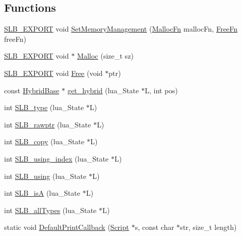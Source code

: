 \subsection*{Functions}
\begin{DoxyCompactItemize}
\item 
\hyperlink{SLB_8hpp_a97cc3bccffa16becf8dfd517dbb6bd88}{S\+L\+B\+\_\+\+E\+X\+P\+O\+RT} void \hyperlink{namespaceSLB_a77db498530d3d864ae836d813adb16e0}{Set\+Memory\+Management} (\hyperlink{namespaceSLB_ad4a59728754dc01e43be2604d8e094b8}{Malloc\+Fn} malloc\+Fn, \hyperlink{namespaceSLB_aee2b8902225c24449d7070dcfe702a30}{Free\+Fn} free\+Fn)
\item 
\hyperlink{SLB_8hpp_a97cc3bccffa16becf8dfd517dbb6bd88}{S\+L\+B\+\_\+\+E\+X\+P\+O\+RT} void $\ast$ \hyperlink{namespaceSLB_aac4d15a823dfe7d83f5b615521c50cea}{Malloc} (size\+\_\+t sz)
\item 
\hyperlink{SLB_8hpp_a97cc3bccffa16becf8dfd517dbb6bd88}{S\+L\+B\+\_\+\+E\+X\+P\+O\+RT} void \hyperlink{namespaceSLB_a0fcdafc8b7518480af90c3022436fdc2}{Free} (void $\ast$ptr)
\item 
const \hyperlink{classSLB_1_1HybridBase}{Hybrid\+Base} $\ast$ \hyperlink{namespaceSLB_a9dbcc8be5046ed4e4a9e51adcdf8f2fa}{get\+\_\+hybrid} (lua\+\_\+\+State $\ast$L, int pos)
\item 
int \hyperlink{namespaceSLB_afbfd289a5aadb332beb05a99118e1760}{S\+L\+B\+\_\+type} (lua\+\_\+\+State $\ast$L)
\item 
int \hyperlink{namespaceSLB_a7d63bcc58a8531a65fdf7ba41a8ef16b}{S\+L\+B\+\_\+rawptr} (lua\+\_\+\+State $\ast$L)
\item 
int \hyperlink{namespaceSLB_a2aab8e64bdc00b0c67be7b479b91ca8c}{S\+L\+B\+\_\+copy} (lua\+\_\+\+State $\ast$L)
\item 
int \hyperlink{namespaceSLB_a71d363d0bda64e01b45dfc897c831a1c}{S\+L\+B\+\_\+using\+\_\+index} (lua\+\_\+\+State $\ast$L)
\item 
int \hyperlink{namespaceSLB_ac5fea559cc4c82ecb598bd043fabef2f}{S\+L\+B\+\_\+using} (lua\+\_\+\+State $\ast$L)
\item 
int \hyperlink{namespaceSLB_a4c3fea270a926c28617e37ad715e6f96}{S\+L\+B\+\_\+isA} (lua\+\_\+\+State $\ast$L)
\item 
int \hyperlink{namespaceSLB_a9c31adf36851032622757edc18f7e588}{S\+L\+B\+\_\+all\+Types} (lua\+\_\+\+State $\ast$L)
\item 
static void \hyperlink{namespaceSLB_a49dddc52a5da5382ebe06ca5fa5aad0b}{Default\+Print\+Callback} (\hyperlink{classSLB_1_1Script}{Script} $\ast$s, const char $\ast$str, size\+\_\+t length)

\end{DoxyCompactItemize}
